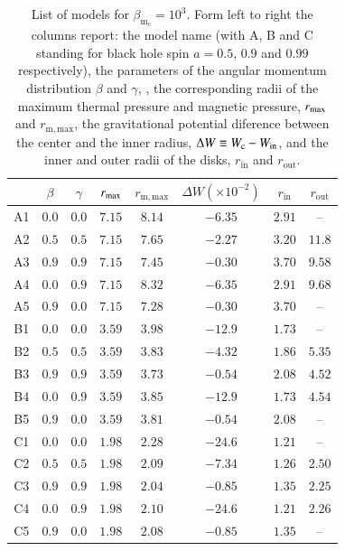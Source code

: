 \documentclass{aa}
\begin{document}
\begin{table}
\caption{List of models for $\beta_{\mathrm{m}_{\mathrm{c}}} = 10^{3}
$. Form left to right the columns report: the model name (with A, B and C standing for black hole spin $a = 0.5$, $0.9$ and $0.99$ respectively), the parameters of the angular momentum distribution $\beta$ and $\gamma$, , the corresponding radii of the maximum thermal pressure and magnetic pressure, $r_{{\rm{max}}}$ and $r_{{\mathrm{m, max}}}$, the gravitational potential diference between the center and the inner radius, $\Delta W\equiv W_{\rm c}-W_{\rm in}$, and the inner and outer radii of the disks, $r_{\mathrm{in}}$ and $r_{\mathrm{out}}$.}             
\label{table:1}      
\centering          
\begin{tabular}{c c c c  c c c c}
\hline\hline       
 & $\beta$ & $\gamma$ & $r_{\rm{max}}$ &  $r_{\mathrm{m, max}}$ & $\Delta W (\times 10^{-2})$ & $r_{\mathrm{in}}$ & $r_{\mathrm{out}}$ \\ 
\hline           
A1 & $0.0$ & $0.0$ & $7.15$ &  $8.14$  & $-6.35$ & $2.91$ & -- \\ 
A2 & $0.5$ & $0.5$ & $7.15$ &  $7.65$  & $-2.27$ & $3.20$ & $11.8$\\ 
A3 & $0.9$ & $0.9$ & $7.15$ &  $7.45$  & $-0.30$ & $3.70$ &  $9.58$\\ 
A4 & $0.0$ & $0.9$ & $7.15$ &  $8.32$  & $-6.35$ & $2.91$ & $9.68$\\ 
A5 & $0.9$ & $0.0$ & $7.15$ &  $7.28$  & $-0.30$ & $3.70$ & --\\ 
 \hline 
B1 & $0.0$ & $0.0$ & $3.59$ &  $3.98$  & $-12.9$ & $1.73$ & -- \\ 
B2 & $0.5$ & $0.5$ & $3.59$ &  $3.83$  & $-4.32$ & $1.86$ & $5.35$\\ 
B3 & $0.9$ & $0.9$ & $3.59$ &  $3.73$  & $-0.54$ & $2.08$ & $4.52$\\ 
B4 & $0.0$ & $0.9$ & $3.59$ &  $3.85$  & $-12.9$ & $1.73$ & $4.54$\\ 
B5 & $0.9$ & $0.0$ & $3.59$ &  $3.81$  & $-0.54$ & $2.08$ & -- \\  
 \hline 
C1 & $0.0$ & $0.0$ & $1.98$ &  $2.28$  & $-24.6$ & $1.21$ & -- \\ 
C2 & $0.5$ & $0.5$ & $1.98$ &  $2.09$  & $-7.34$ & $1.26$ & $2.50$\\ 
C3 & $0.9$ & $0.9$ & $1.98$ &  $2.04$  & $-0.85$ & $1.35$ & $2.25$\\ 
C4 & $0.0$ & $0.9$ & $1.98$ &  $2.10$  & $-24.6$ & $1.21$ & $2.26$\\ 
C5 & $0.9$ & $0.0$ & $1.98$ &  $2.08$  & $-0.85$ & $1.35$ & --\\ 
\hline      
\end{tabular}
\end{table}
\end{document}
